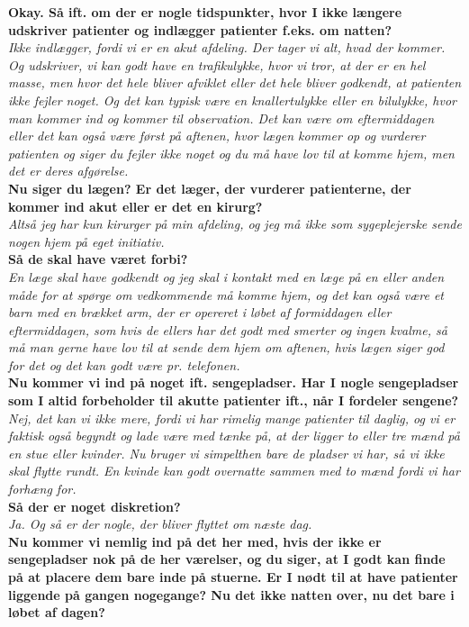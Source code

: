 \noindent
\textbf{Okay. Så ift. om der er nogle tidspunkter, hvor I ikke længere udskriver patienter og indlægger patienter f.eks. om natten?}\\
\noindent
\textit{Ikke indlægger, fordi vi er en akut afdeling. Der tager vi alt, hvad der kommer. Og udskriver, vi kan godt have en trafikulykke, hvor vi tror, at der er en hel masse, men hvor det hele bliver afviklet eller det hele bliver godkendt, at patienten ikke fejler noget. Og det kan typisk være en knallertulykke eller en bilulykke, hvor man kommer ind og kommer til observation. Det kan være om eftermiddagen eller det kan også være først på aftenen, hvor lægen kommer op og vurderer patienten og siger du fejler ikke noget og du må have lov til at komme hjem, men det er deres afgørelse.}\\
\noindent
\textbf{Nu siger du lægen? Er det læger, der vurderer patienterne, der kommer ind akut eller er det en kirurg?}\\
\noindent
\textit{Altså jeg har kun kirurger på min afdeling, og jeg må ikke som sygeplejerske sende nogen hjem på eget initiativ.}\\
\noindent
\textbf{Så de skal have været forbi?}\\
\noindent
\textit{En læge skal have godkendt og jeg skal i kontakt med en læge på en eller anden måde for at spørge om vedkommende må komme hjem, og det kan også være et barn med en brækket arm, der er opereret i løbet af formiddagen eller eftermiddagen, som hvis de ellers har det godt med smerter og ingen kvalme, så må man gerne have lov til at sende dem hjem om aftenen, hvis lægen siger god for det og det kan godt være pr. telefonen.}\\
\noindent
\textbf{Nu kommer vi ind på noget ift. sengepladser. Har I nogle sengepladser som I altid forbeholder til akutte patienter ift., når I fordeler sengene?}\\
\noindent
\textit{ Nej, det kan vi ikke mere, fordi vi har rimelig mange patienter til daglig, og vi er faktisk også begyndt og lade være med tænke på, at der ligger to eller tre mænd på en stue eller kvinder. Nu bruger vi simpelthen bare de pladser vi har, så vi ikke skal flytte rundt. En kvinde kan godt overnatte sammen med to mænd fordi vi har forhæng for.}\\
\noindent
\textbf{Så der er noget diskretion?}\\
\noindent
\textit{Ja. Og så er der nogle, der bliver flyttet om næste dag.}\\
\noindent
\textbf{Nu kommer vi nemlig ind på det her med, hvis der ikke er sengepladser nok på de her værelser, og du siger, at I godt kan finde på at placere dem bare inde på stuerne. Er I nødt til at have patienter liggende på gangen nogegange? Nu det ikke natten over, nu det bare i løbet af dagen?}\\
